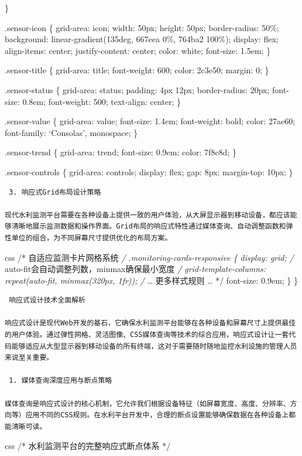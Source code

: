 \}

.sensor-icon \{ grid-area: icon; width: 50px; height: 50px; border-radius: 50\%; background: linear-gradient(135deg, 667eea 0\%, 764ba2 100\%); display: flex; align-items: center; justify-content: center; color: white; font-size: 1.5em; \}

.sensor-title \{ grid-area: title; font-weight: 600; color: 2c3e50; margin: 0; \}

.sensor-status \{ grid-area: status; padding: 4px 12px; border-radius: 20px; font-size: 0.8em; font-weight: 500; text-align: center; \}

.sensor-value \{ grid-area: value; font-size: 1.4em; font-weight: bold; color: 27ae60; font-family: `Consolas', monospace; \}

.sensor-trend \{ grid-area: trend; font-size: 0.9em; color: 7f8c8d; \}

.sensor-controls \{ grid-area: controls; display: flex; gap: 8px; margin-top: 10px; \}

\begin{lstlisting}
 3. 响应式Grid布局设计策略

现代水利监测平台需要在各种设备上提供一致的用户体验，从大屏显示器到移动设备，都应该能够清晰地展示监测数据和操作界面。Grid布局的响应式特性通过媒体查询、自动调整函数和弹性单位的组合，为不同屏幕尺寸提供优化的布局方案。
\end{lstlisting}

css /* 自适应监测卡片网格系统 \emph{/ .monitoring-cards-responsive \{ display: grid; /} auto-fit会自动调整列数，minmax确保最小宽度 \emph{/ grid-template-columns: repeat(auto-fit, minmax(320px, 1fr)); /} \ldots{} 更多样式规则 \ldots{} */ font-size: 0.9em; \} \}

\begin{lstlisting}
 响应式设计技术全面解析

响应式设计是现代Web开发的基石，它确保水利监测平台能够在各种设备和屏幕尺寸上提供最佳的用户体验。通过弹性网格、灵活图像、CSS媒体查询等技术的综合应用，响应式设计让一套代码能够适应从大型显示器到移动设备的所有终端，这对于需要随时随地监控水利设施的管理人员来说至关重要。

 1. 媒体查询深度应用与断点策略

媒体查询是响应式设计的核心机制，它允许我们根据设备特征（如屏幕宽度、高度、分辨率、方向等）应用不同的CSS规则。在水利平台开发中，合理的断点设置能够确保数据在各种设备上都能清晰可读。
\end{lstlisting}

css /* 水利监测平台的完整响应式断点体系 */

